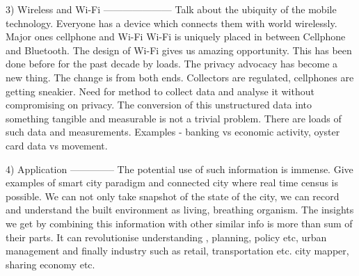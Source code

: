 3) Wireless and Wi-Fi
---------------------
Talk about the ubiquity of the mobile technology. Everyone has a device which
connects them with world wirelessly. Major ones cellphone and Wi-Fi Wi-Fi is
uniquely placed in between Cellphone and Bluetooth. The design of Wi-Fi gives us
amazing opportunity. This has been done before for the past decade by loads. The
privacy advocacy has become a new thing. The change is from both ends.
Collectors are regulated, cellphones are getting sneakier.  Need for method to
collect data and analyse it without compromising on privacy.  The conversion of
this unstructured data into something tangible and measurable is not a trivial
problem. There are loads of such data and measurements.  Examples - banking vs
economic activity, oyster card data vs movement.

4) Application
--------------
The potential use of such information is immense. Give examples of smart city
paradigm and connected city where real time census is possible.  We can not only
take snapshot of the state of the city, we can record and understand the built
environment as living, breathing organism.  The insights we get by combining
this information with other similar info is more than sum of their parts. It can
revolutionise understanding , planning, policy etc, urban management and finally
industry such as retail, transportation etc. city mapper, sharing economy etc.
